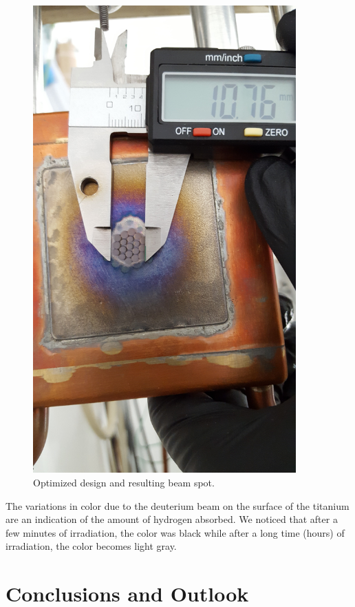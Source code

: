 \documentclass[review]{elsarticle}
\begin{document}
\begin{figure}
	\centering
	\includegraphics[width=0.9\textwidth]{pics/optimized_notChamfered}
	\caption{Optimized design and resulting beam spot.}
	\label{fig:optimized_notChamfered}
\end{figure}  

The variations in color due to the deuterium beam on the surface of the titanium are an indication of the amount of hydrogen absorbed. We noticed that after a few minutes of irradiation, the color was black while after a long time (hours) of irradiation, the color becomes light gray.  

\section{Conclusions and Outlook}
\end{document}
